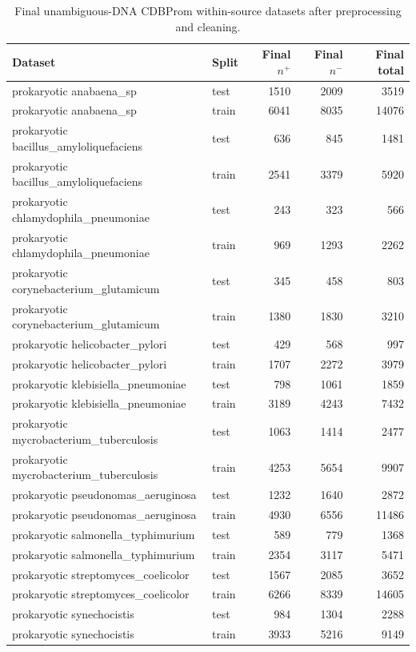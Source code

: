 \begin{table}[htbp]
\centering
\small
\caption{Final unambiguous-DNA CDBProm within-source datasets after preprocessing and cleaning.}
\label{tab:cdbprom-within-source-final}
\begin{tabular}{p{}lrrr}
\hline
Dataset & Split & Final $n^{+}$ & Final $n^{-}$ & Final total \\
\hline
prokaryotic anabaena\_sp & test & 1510 & 2009 & 3519 \\
prokaryotic anabaena\_sp & train & 6041 & 8035 & 14076 \\
prokaryotic bacillus\_amyloliquefaciens & test & 636 & 845 & 1481 \\
prokaryotic bacillus\_amyloliquefaciens & train & 2541 & 3379 & 5920 \\
prokaryotic chlamydophila\_pneumoniae & test & 243 & 323 & 566 \\
prokaryotic chlamydophila\_pneumoniae & train & 969 & 1293 & 2262 \\
prokaryotic corynebacterium\_glutamicum & test & 345 & 458 & 803 \\
prokaryotic corynebacterium\_glutamicum & train & 1380 & 1830 & 3210 \\
prokaryotic helicobacter\_pylori & test & 429 & 568 & 997 \\
prokaryotic helicobacter\_pylori & train & 1707 & 2272 & 3979 \\
prokaryotic klebisiella\_pneumoniae & test & 798 & 1061 & 1859 \\
prokaryotic klebisiella\_pneumoniae & train & 3189 & 4243 & 7432 \\
prokaryotic mycrobacterium\_tuberculosis & test & 1063 & 1414 & 2477 \\
prokaryotic mycrobacterium\_tuberculosis & train & 4253 & 5654 & 9907 \\
prokaryotic pseudonomas\_aeruginosa & test & 1232 & 1640 & 2872 \\
prokaryotic pseudonomas\_aeruginosa & train & 4930 & 6556 & 11486 \\
prokaryotic salmonella\_typhimurium & test & 589 & 779 & 1368 \\
prokaryotic salmonella\_typhimurium & train & 2354 & 3117 & 5471 \\
prokaryotic streptomyces\_coelicolor & test & 1567 & 2085 & 3652 \\
prokaryotic streptomyces\_coelicolor & train & 6266 & 8339 & 14605 \\
prokaryotic synechocistis & test & 984 & 1304 & 2288 \\
prokaryotic synechocistis & train & 3933 & 5216 & 9149 \\
\hline
\end{tabular}
\end{table}

